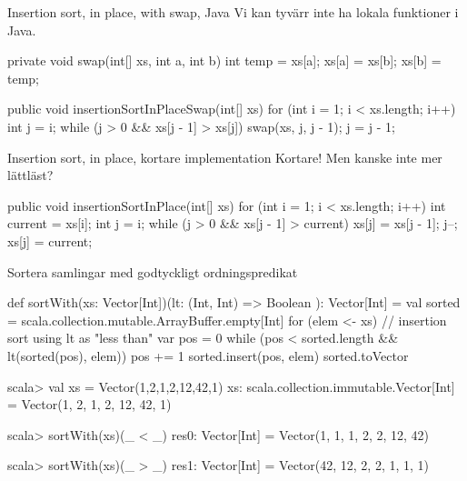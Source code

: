 \begin{Slide}{Insertion sort, in place, with swap, Java}
Vi kan tyvärr inte ha lokala funktioner i Java.
\begin{Code}[language=Java]
private void swap(int[] xs, int a, int b) {
    int temp = xs[a];
    xs[a] = xs[b];
    xs[b] = temp;
}

public void insertionSortInPlaceSwap(int[] xs) {
    for (int i = 1; i < xs.length; i++) {
        int j = i;
        while (j > 0 && xs[j - 1] > xs[j]) {
            swap(xs, j, j - 1);
            j = j - 1;
        }
    }
}
\end{Code}
\end{Slide}

\begin{Slide}{Insertion sort, in place, kortare implementation}
Kortare! Men kanske inte mer lättläst?
\begin{Code}[language=Java]
    public void insertionSortInPlace(int[] xs) {
        for (int i = 1; i < xs.length; i++) {
            int current = xs[i];
            int j = i;
            while (j > 0 && xs[j - 1] > current) {
                xs[j] = xs[j - 1];
                j--;
            }
            xs[j] = current;
        }
    }
\end{Code}

\end{Slide}




\begin{Slide}{Sortera samlingar med godtyckligt ordningspredikat}
\begin{Code}
def sortWith(xs: Vector[Int])(lt: (Int, Int) => Boolean ): Vector[Int] = {
  val sorted = scala.collection.mutable.ArrayBuffer.empty[Int]
  for (elem <- xs) {  // insertion sort using lt as "less than"
     var pos = 0
     while (pos < sorted.length && lt(sorted(pos), elem)) {
       pos += 1
     }
     sorted.insert(pos, elem)
  }
  sorted.toVector
}
\end{Code}
\pause
\begin{REPL}
scala> val xs = Vector(1,2,1,2,12,42,1)
xs: scala.collection.immutable.Vector[Int] = Vector(1, 2, 1, 2, 12, 42, 1)

scala> sortWith(xs)(_ < _)
res0: Vector[Int] = Vector(1, 1, 1, 2, 2, 12, 42)

scala> sortWith(xs)(_ > _)
res1: Vector[Int] = Vector(42, 12, 2, 2, 1, 1, 1)
\end{REPL}
\end{Slide}


